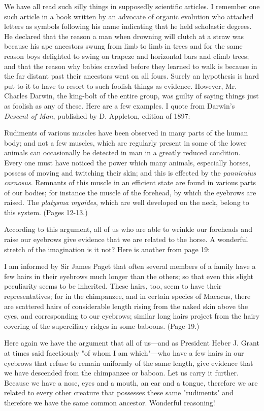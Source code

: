 We have all read such silly things in supposedly scientific articles. I remember one such
article in a book written by an advocate of organic evolution who attached letters as symbols
following his name indicating that he held scholastic degrees. He declared that the reason a
man when drowning will clutch at a straw was because his ape ancestors swung from limb to
limb in trees and for the same reason boys delighted to swing on trapeze and horizontal bars
and climb trees; and that the reason why babies crawled before they learned to walk is
because in the far distant past their ancestors went on all fours. Surely an hypothesis is hard
put to it to have to resort to such foolish things as evidence. However, Mr. Charles Darwin,
the king-bolt of the entire group, was guilty of saying things just as foolish as any of these.
Here are a few examples. I quote from Darwin's \textit{Descent of Man}, published by D. Appleton,
edition of 1897:

Rudiments of various muscles have been observed in many parts of the human body; and not
a few muscles, which are regularly present in some of the lower animals can occasionally be
detected in man in a greatly reduced condition. Every one must have noticed the power
which many animals, especially horses, possess of moving and twitching their skin; and this
is effected by the \textit{panniculus carnosus}. Remnants of this muscle in an efficient state are
found in various parts of our bodies; for instance the muscle of the forehead, by which the
eyebrows are raised. The \textit{platysma myoides}, which are well developed on the neck, belong to
this system. (Pages 12-13.)

According to this argument, all of us who are able to wrinkle our foreheads and raise our
eyebrows give evidence that we are related to the horse. A wonderful stretch of the
imagination is it not? Here is another from page 19:

I am informed by Sir James Paget that often several members of a family have a few hairs in
their eyebrows much longer than the others; so that even this slight peculiarity seems to be
inherited. These hairs, too, seem to have their representatives; for in the chimpanzee, and in
certain species of Macacus, there are scattered hairs of considerable length rising from the
naked skin above the eyes, and corresponding to our eyebrows; similar long hairs project
from the hairy covering of the superciliary ridges in some baboons. (Page 19.)

Here again we have the argument that all of us—and as President Heber J. Grant at times said
facetiously "of whom I am which"—who have a few hairs in our eyebrows that refuse to
remain uniformly of the same length, give evidence that we have descended from the
chimpanzee or baboon. Let us carry it further. Because we have a nose, eyes and a mouth, an
ear and a tongue, therefore we are related to every other creature that possesses these same
"rudiments" and therefore we have the same common ancestor. Wonderful reasoning!

